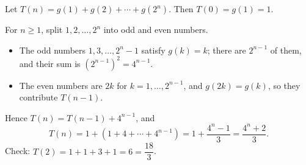 Let $T(n)=g(1)+g(2)+\cdots+g\left(2^n\right)$. Then $T(0)=g(1)=1$.

For $n\ge1$, split $1,2,\dots,2^n$ into odd and even numbers.
\begin{itemize}
\item The odd numbers $1,3,\dots,2^n-1$ satisfy $g(k)=k$; there are $2^{n-1}$ of them, and their sum is $\left(2^{n-1}\right)^2=4^{n-1}$.
\item The even numbers are $2k$ for $k=1,\dots,2^{n-1}$, and $g(2k)=g(k)$, so they contribute $T(n-1)$.
\end{itemize}
Hence $T(n)=T(n-1)+4^{n-1}$, and
\[T(n)=1+\left(1+4+\cdots+4^{n-1}\right)=1+\dfrac{4^n-1}{3}=\boxed{\dfrac{4^n+2}{3}}.\]
Check: $T(2)=1+1+3+1=6=\dfrac{18}{3}$.
